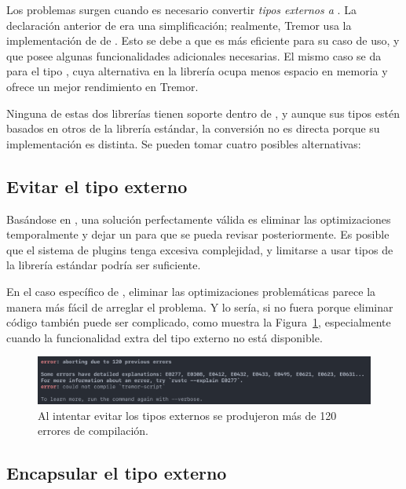 Los problemas surgen cuando es necesario convertir \emph{tipos externos a
\abistable}. La declaración anterior de  era una simplificación;
realmente, Tremor usa la implementación de  de
. Esto se debe a que es más eficiente para su caso de uso, y que
posee algunas funcionalidades adicionales necesarias. El mismo caso se da para
el tipo , cuya alternativa en la librería  ocupa menos
espacio en memoria y ofrece un mejor rendimiento en Tremor.

Ninguna de estas dos librerías tienen soporte dentro de \abistable, y aunque
sus tipos estén basados en otros de la librería estándar, la conversión no es
directa porque su implementación es distinta. Se pueden tomar cuatro posibles
alternativas:

\subsection{Evitar el tipo externo}

Basándose en \work, una solución perfectamente válida es eliminar las
optimizaciones temporalmente y dejar un  para que se pueda revisar
posteriormente. Es posible que el sistema de plugins tenga excesiva complejidad,
y limitarse a usar tipos de la librería estándar podría ser suficiente.

En el caso específico de , eliminar las optimizaciones problemáticas
parece la manera más fácil de arreglar el problema. Y lo sería, si no fuera
porque eliminar código también puede ser complicado, como muestra la
Figura~\ref{fig:errors}, especialmente cuando la funcionalidad extra del tipo
externo no está disponible.

\begin{figure}
    \centering
    \includegraphics[width=\textwidth]{./Imagenes/errors.png}
    \caption{Al intentar evitar los tipos externos se produjeron más de 120
    errores de compilación.}%
    \label{fig:errors}
\end{figure}

\subsection{Encapsular el tipo externo}

